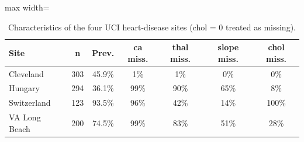\begin{table}[!t]
\centering
\scriptsize
\caption{Characteristics of the four UCI heart-disease sites (chol = 0 treated as missing).}
\label{tab:sites}
\setlength{\tabcolsep}{3pt}
\begin{adjustbox}{max width=\linewidth}
\begin{tabular}{lcccccc}
\toprule
Site & n & Prev. & ca miss. & thal miss. & slope miss. & chol miss. \\
\midrule
Cleveland & 303 & 45.9\% & 1\% & 1\% & 0\% & 0\% \\
Hungary & 294 & 36.1\% & 99\% & 90\% & 65\% & 8\% \\
Switzerland & 123 & 93.5\% & 96\% & 42\% & 14\% & 100\% \\
VA Long Beach & 200 & 74.5\% & 99\% & 83\% & 51\% & 28\% \\
\bottomrule
\end{tabular}
\end{adjustbox}
\end{table}
